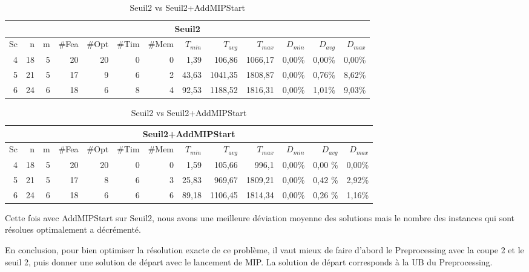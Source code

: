 \documentclass[twoside,fleqn]{EPURapport}
\begin{document}
\begin{table}[h]
    \centering
    \begin{tabular}{|r|r|r|r|r|r|r|r|r|r|r|r|r|}
    	\hline
    	\multicolumn{13}{|c|}{Seuil2}\\ \hline
Sc &	n	&m	&\#Fea	&\#Opt	&\#Tim &\#Mem	&$T_{min}$ & $T_{avg}$	& $T_{max}$ & $D_{min}$ & $D_{avg}$	& $D_{max}$ \\ \hline
4 &	18	&5	&20	&20	&0	&0	&1,39	&106,86	    &1066,17	&0,00\%&	0,00\%&	0,00\% \\ \hline
5 &	21	&5	&17	&9	&6	&2	&43,63	&1041,35	&1808,87	&0,00\%&	0,76\%&	8,62\% \\ \hline
6 &	24	&6	&18	&6	&8	&4	&92,53	&1188,52	&1816,31	&0,00\%&	1,01\%&	9,03\% \\ \hline
    \end{tabular}
    \label{tab_cut2_ams1_tab2}
\vspace{2em}
    \begin{tabular}{|r|r|r|r|r|r|r|r|r|r|r|r|r|}
    	\hline
    	\multicolumn{13}{|c|}{Seuil2+AddMIPStart}\\ \hline
Sc &	n	&m	&\#Fea	&\#Opt	&\#Tim &\#Mem	&$T_{min}$ & $T_{avg}$	& $T_{max}$ & $D_{min}$ & $D_{avg}$	& $D_{max}$ \\ \hline
4 &	18	&5	&20	&20	&0	&0	&1,59	&105,66	   & 996,1	&   0,00\%&	0,00	\%&0,00\% \\ \hline
5 &	21	&5	&17	&8	&6	&3	&25,83	&969,67	   & 1809,21&	0,00\%&	0,42	\%&2,92\% \\ \hline
6 &	24	&6	&18	&6	&6	&6	&89,18	&1106,45	&1814,34&	0,00\%&	0,26	\%&1,16\% \\ \hline

    \end{tabular}
    \caption{Seuil2 vs Seuil2+AddMIPStart}
    \label{tab_cut2_ams2_tab2}
\end{table}
\bigskip
Cette fois avec AddMIPStart sur Seuil2, nous avons une meilleure déviation moyenne des solutions mais le nombre des instances qui sont résolues optimalement a décrémenté. 


En conclusion, pour bien optimiser la résolution exacte de ce problème, il vaut mieux de faire d'abord le Preprocessing avec la coupe 2 et le seuil 2, puis donner une solution de départ avec le lancement de MIP. La solution de départ corresponds à la UB du Preprocessing.




\end{document}
